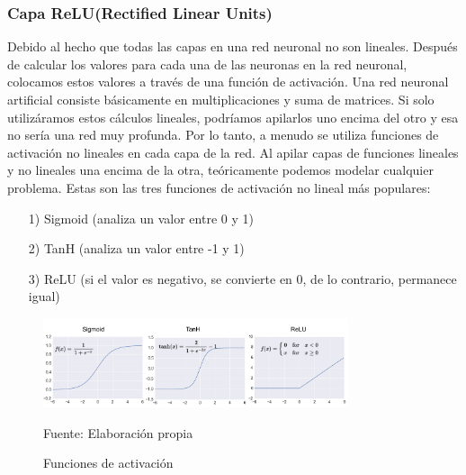 	\subsubsection  {Capa ReLU(Rectified Linear Units)}
		\vskip 0.4cm 
		Debido al hecho que todas las capas en una red neuronal no son lineales. Después de calcular los valores para cada una de las neuronas en la red neuronal, colocamos estos valores a través de una función de activación. Una red neuronal artificial consiste básicamente en multiplicaciones y suma de matrices. Si solo utilizáramos estos cálculos lineales, podríamos apilarlos uno encima del otro y esa no sería una red muy profunda. Por lo tanto, a menudo se utiliza funciones de activación no lineales en cada capa de la red. Al apilar capas de funciones lineales y no lineales una encima de la otra, teóricamente podemos modelar cualquier problema.
		\vskip 0.4cm 
		Estas son las tres funciones de activación no lineal más populares:
		\begin{enumerate}
		\item[1)] Sigmoid (analiza un valor entre 0 y 1)  \vspace{-0.5em}
		\item[2)] TanH (analiza un valor entre -1 y 1) \vspace{-0.5em}
		\item[3)] ReLU (si el valor es negativo, se convierte en 0, de lo contrario, permanece igual) \vspace{-0.5em}
		\end{enumerate}

		\begin{figure}[H]
		\begin{center}
		\includegraphics[width=0.8\textwidth]{images/marcoteorico/activfunct}
		\end{center}
		\begin{center}
		\caption{\small{Funciones de activación}}
		\vskip -0.2cm  
		{\small{Fuente: Elaboración propia}}
		\end{center}
		\vspace{-1.5em}
		\end{figure}

